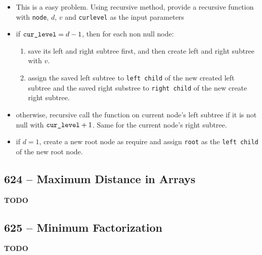 \documentclass[a4paper,12pt]{article}
\begin{document}
\begin{itemize}
	\item This is a easy problem. Using recursive method, provide a recursive function with \texttt{node}, $d$, $v$ and \texttt{cur\textunderscore level} as the input parameters
	\item if $\texttt{cur\textunderscore level} = d - 1$, then for each non null node:
	\begin{enumerate}
		\item save its left and right subtree first, and then create left and right subtree with $v$. 
		\item assign the saved left subtree to \texttt{left child} of the new created left subtree and the saved right substree to \texttt{right child} of the new create right subtree.
	\end{enumerate}
	\item otherwise, recursive call the function on current node's left subtree if it is not null with $\texttt{cur\textunderscore level} + 1$. Same for the current node's right subtree.
	\item if $d=1$, create a new root node as require and assign \texttt{root} as the \texttt{left child} of the new root node.
\end{itemize}

\subsection{624 -- Maximum Distance in Arrays}
\textbf{\Huge{TODO}}

\subsection{625 -- Minimum Factorization}
\textbf{\Huge{TODO}}
\end{document}
